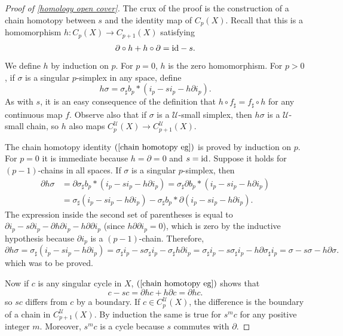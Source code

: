 \begin{proof}[Proof of \cref{homology open cover}]
The crux of the proof is the construction of a chain homotopy between $s$ and the identity map of $C_p(X)$. Recall that this is a homomorphism $h:C_p(X)\to C_{p+1}(X)$ satisfying
\begin{align}\label{chain homotopy eg}
\partial\circ h+h\circ\partial=\mathrm{id}-s.
\end{align}
We define $h$ by induction on $p$. For $p=0$, $h$ is the zero homomorphism. For $p>0$, if $\sigma$ is a singular $p$-simplex in any space, define
\[h\sigma=\sigma_\sharp b_p\ast(i_p-si_p-h\partial i_p).\]
As with $s$, it is an easy consequence of the definition that $h\circ f_\sharp=f_\sharp\circ h$ for any continuous map $f$. Observe also that if $\sigma$ is a $\mathcal{U}$-small simplex, then $h\sigma$ is a $\mathcal{U}$-small
chain, so $h$ also maps $C^\mathcal{U}_p(X)\to C^\mathcal{U}_{p+1}(X)$.\par
The chain homotopy identity $(\ref{chain homotopy eg})$ is proved by induction on $p$. For $p=0$ it is immediate because $h=\partial=0$ and $s=\mathrm{id}$. Suppose it holds for $(p-1)$-chains in all spaces. If $\sigma$ is a singular $p$-simplex, then
\begin{align*}
\partial h\sigma&=\partial\sigma_\sharp b_p\ast(i_p-si_p-h\partial i_p)
=\sigma_\sharp\partial b_p\ast(i_p-si_p-h\partial i_p)\\
&=\sigma_\sharp(i_p-si_p-h\partial i_p)-\sigma_\sharp b_p\ast\partial(i_p-si_p-h\partial i_p).
\end{align*}
The expression inside the second set of parentheses is equal to $\partial i_p-s\partial i_p-\partial h\partial i_p-h\partial\partial i_p$ (since $h\partial\partial i_p=0$), which is zero by the inductive hypothesis because $\partial i_p$ is a $(p-1)$-chain. Therefore,
\[\partial h\sigma=\sigma_\sharp(i_p-si_p-h\partial i_p)=\sigma_\sharp i_p-s\sigma_\sharp i_p-\sigma_\sharp h\partial i_p=\sigma_\sharp i_p-s\sigma_\sharp i_p-h\partial\sigma_\sharp i_p=\sigma-s\sigma-h\partial\sigma.\]
which was to be proved.\par
Now if $c$ is any singular cycle in $X$, $(\ref{chain homotopy eg})$ shows that
\[c-sc=\partial hc+h\partial c=\partial hc.\]
so $sc$ differs from $c$ by a boundary. If $c\in C^\mathcal{U}_p(X)$, the difference is the boundary of a chain in $C^\mathcal{U}_{p+1}(X)$. By induction the same is true for $s^mc$ for any positive integer $m$. Moreover, $s^mc$ is a cycle because $s$ commutes with $\partial$.\par

\end{proof}
